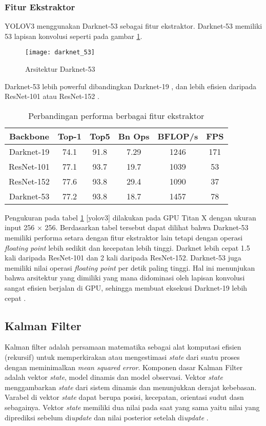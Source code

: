 \documentclass[../thesis.tex]{subfiles}
\begin{document}
\subsubsection{Fitur Ekstraktor}
YOLOV3 menggunakan Darknet-53 sebagai fitur ekstraktor. Darknet-53 memiliki 53 lapisan konvolusi seperti pada gambar \ref{darknet_53}.
\begin{figure}[htp]
	\centering
	\texttt{[image: darknet\_53]}
	\caption{Arsitektur Darknet-53}
	\label{darknet_53}
\end{figure}
Darknet-53 lebih powerful dibandingkan Darknet-19 \cite{YoloV2}, dan lebih efisien daripada ResNet-101 atau ResNet-152 \cite{YoloV3}.

\begin{table}[htp]
\centering
\begin{tabular}{ cccccc } 
	Backbone & Top-1 & Top5 & Bn Ops & BFLOP/s & FPS\\
	\hline
	Darknet-19 \cite{YoloV2} & 74.1& 91.8& 7.29& 1246 & 171\\
	ResNet-101 \cite{ResNet} & 77.1& 93.7& 19.7& 1039 & 53 \\
	ResNet-152 \cite{ResNet} & 77.6& 93.8 &29.4& 1090 & 37 \\
	Darknet-53 \cite{YoloV3} &77.2& 93.8&18.7& 1457 & 78 \\
\end{tabular}
\caption{Perbandingan performa berbagai fitur ekstraktor}
\label{tabel_comp_FE}
\end{table}
Pengukuran pada tabel \ref{tabel_comp_FE} [yolov3] dilakukan pada GPU Titan X dengan ukuran input 256 × 256. Berdasarkan tabel tersebut dapat dilihat bahwa Darknet-53 memiliki performa setara dengan fitur ekstraktor lain tetapi dengan operasi \textit{floating point} lebih sedikit dan kecepatan lebih tinggi. Darknet lebih cepat 1.5 kali daripada ResNet-101 dan 2 kali daripada ResNet-152.
Darknet-53 juga memiliki nilai operasi \textit{floating point} per detik paling tinggi. Hal ini menunjukan bahwa arsitektur yang dimiliki yang mana didominasi oleh lapisan konvolusi sangat efisien berjalan di GPU, sehingga membuat eksekusi Darknet-19 lebih cepat \cite{YoloV3}.

\subsection{Kalman Filter}

Kalman filter adalah persamaan matematika sebagai alat komputasi efisien (rekursif) untuk memperkirakan atau mengestimasi \textit{state} dari suatu proses dengan meminimalkan \textit{mean squared error}.
Komponen dasar Kalman Filter adalah vektor \textit{state}, model dinamis dan model observasi.
Vektor \textit{state} menggambarkan \textit{state} dari sistem dinamis dan menunjukkan derajat kebebasan. Varabel di vektor \textit{state} dapat berupa posisi, kecepatan, orientasi sudut dasn sebagainya. Vektor \textit{state} memiliki dua nilai pada saat yang sama yaitu 
nilai yang diprediksi sebelum di\textit{update} dan nilai posterior setelah di\textit{update} \cite{Kalman}.
\end{document}
